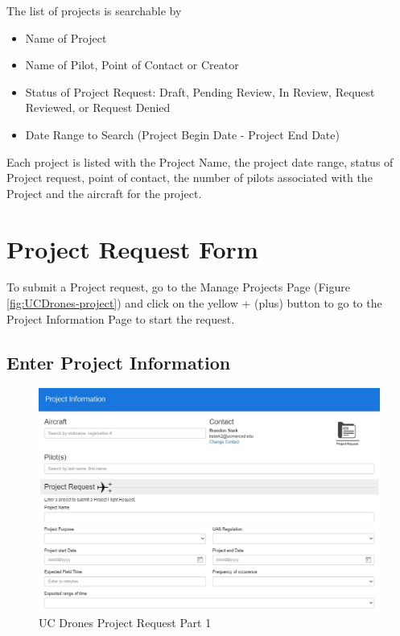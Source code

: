 \documentclass[
]{book}
\providecommand{\tightlist}{%
  \setlength{\itemsep}{0pt}\setlength{\parskip}{0pt}}
\begin{document}
The list of projects is searchable by

\begin{itemize}
\tightlist
\item
  Name of Project
\item
  Name of Pilot, Point of Contact or Creator
\item
  Status of Project Request: Draft, Pending Review, In Review, Request Reviewed, or Request Denied
\item
  Date Range to Search (Project Begin Date - Project End Date)
\end{itemize}

Each project is listed with the Project Name, the project date range, status of Project request, point of contact, the number of pilots associated with the Project and the aircraft for the project.

\hypertarget{project-request-form}{%
\section{Project Request Form}\label{project-request-form}}

To submit a Project request, go to the Manage Projects Page (Figure \ref{fig:UCDrones-project}) and click on the yellow + (plus) button to go to the Project Information Page to start the request.

\hypertarget{enter-project-information}{%
\subsection{Enter Project Information}\label{enter-project-information}}

\begin{figure}

{\centering \includegraphics[width=0.95\linewidth]{images/UCDrones_project_1} 

}

\caption{UC Drones Project Request Part 1}\label{fig:UCDrones-project-p1}
\end{figure}
\end{document}
